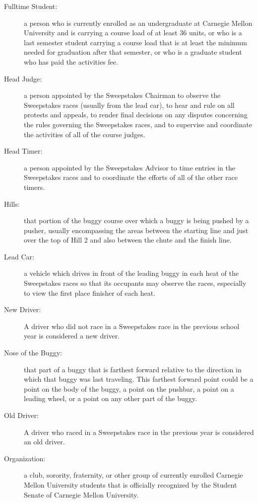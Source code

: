 \begin{description}
	\item[Fulltime Student:]
	a person who is currently enrolled as an undergraduate at Carnegie Mellon University and is carrying a course load of at least 36 units, or who is a last semester student carrying a course load that is at least the minimum needed for graduation after that semester, or who is a graduate student who has paid the activities fee.

	\item[Head Judge:]
	a person appointed by the Sweepstakes Chairman to observe the Sweepstakes races (usually from the lead car), to hear and rule on all protests and appeals, to render final decisions on any disputes concerning the rules governing the Sweepstakes races, and to supervise and coordinate the activities of all of the course judges.

	\item[Head Timer:]
	a person appointed by the Sweepstakes Advisor to time entries in the Sweepstakes races and to coordinate the efforts of all of the other race timers.

	\item[Hills:]
	that portion of the buggy course over which a buggy is being pushed by a pusher, usually encompassing the areas between the starting line and just over the top of Hill 2 and also between the chute and the finish line.

	\item[Lead Car:]
	a vehicle which drives in front of the leading buggy in each heat of the Sweepstakes races so that its occupants may observe the races, especially to view the first place finisher of each heat.

	\item [New Driver:] 
	A driver who did not race in a Sweepstakes race in the previous school year is considered a new driver.

	\item[Nose of the Buggy:]
	that part of a buggy that is farthest forward relative to the direction in which that buggy was last traveling. This farthest forward point could be a point on the body of the buggy, a point on the pushbar, a point on a leading wheel, or a point on any other part of the buggy.

    \item [Old Driver:] 
	A driver who raced in a Sweepstakes race in the previous year is considered an old driver.

	\item[Organization:]
	a club, sorority, fraternity, or other group of currently enrolled Carnegie Mellon University students that is officially recognized by the Student Senate of Carnegie Mellon University.


\end{description}
